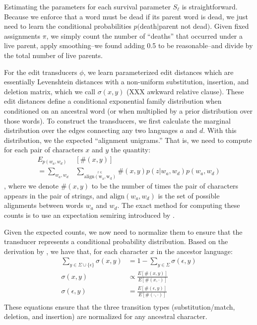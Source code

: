 \documentclass[11pt,a4paper]{article}
\begin{document}
Estimating the parameters for each survival parameter $S_\ell$ is
straightforward. Because we enforce that a word must be dead if its
parent word is dead, we just need to learn the conditional probabilities
$p($death$|$parent not dead$)$. Given fixed assignments $\pi$, we
simply count the number of ``deaths'' that occurred under a live
parent, apply smoothing--we found adding 0.5 to be reasonable--and
divide by the total number of live parents.

For the edit transducers $\phi$, we learn parameterized edit distances
which are essentially Levenshtein distances with a non-uniform
substitution, insertion, and deletion matrix, which we call
$\sigma(x,y)$ (XXX awkward relative clause). These edit distances
define a conditional exponential family distribution when conditioned
on an ancestral word (or when multiplied by a prior distribution
over those words). To construct the transducers, we first calculate
the marginal distribution over the edges connecting any two languages
$a$ and $d$. With this distribution, we the expected
``alignment unigrams.'' That is, we
need to compute for each pair of characters $x$ and $y$ the quantity:
\begin{equation}
  \begin{split}
    E_{p(w_a,w_d)}&[\#(x,y)] \\ = \sum_{w_a,w_d} &\sum_{\stackrel{z\in}{\scriptscriptstyle\mathrm{align(w_a,w_d)}}} \#(x,y) p(z|w_a,w_d)p(w_a,w_d)
   \end{split}
 \end{equation}
, where we denote $\#(x,y)$ to be the number of times the pair of characters
appears in the pair of strings, and $\mathrm{align}(w_a,w_d)$ is the set of possible
alignments between words $w_a$ and $w_d$. The exact method for computing
these counts is to use an expectation semiring introduced by
.

Given the expected counts, we now need to normalize them to ensure
that the transducer represents a conditional probability distribution.
Based on the derivation by  , we have that,
for each character $x$ in the ancestor language:
\begin{equation}
  \begin{split}
    \sum_{y \in \Sigma \cup \{\epsilon\}} \sigma(x,y) &= 1 - \sum_{y \in \Sigma} \sigma(\epsilon,y) \\
    \sigma(x,y) &\propto \frac{E[\#(x,y)]}{E[\#(x,\cdot)]} \\
    \sigma(\epsilon,y) &= \frac{E[\#(\epsilon,y)]}{E[\#(\cdot,\cdot)]} \\
   \end{split}
 \end{equation}
These equations ensure that the three transition types (substitution/match,
deletion, and insertion) are normalized for any ancestral character.
\end{document}
